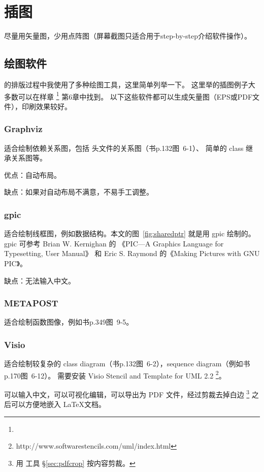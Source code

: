 \chapter{插图}

尽量用矢量图，少用点阵图（屏幕截图只适合用于step-by-step介绍软件操作）。

\section{绘图软件}

\mybooktitle 的排版过程中我使用了多种绘图工具，这里简单列举一下。
这里举的插图例子大多数可以在样章 \footnote{} 第6章中找到。
以下这些软件都可以生成矢量图（EPS或PDF文件），印刷效果较好。

\subsection{Graphviz}
适合绘制依赖关系图，包括  头文件的关系图（书p.132图~6-1）、
简单的 class 继承关系图等。

优点：自动布局。

缺点：如果对自动布局不满意，不易手工调整。
\subsection{gpic}

适合绘制线框图，例如数据结构。本文的图~\ref{fig:sharedptr} 就是用 gpic 绘制的。
gpic 可参考 Brian W. Kernighan 的 《PIC---A Graphics Language for Typesetting, User Manual》
和 Eric S. Raymond 的《Making Pictures with GNU PIC》。

缺点：无法输入中文。

\subsection{METAPOST}
适合绘制函数图像，例如书p.349图~9-5。

\subsection{Visio}
适合绘制较复杂的 class diagram（书p.132图~6-2），sequence diagram（例如书p.170图~6-12）。
需要安装 	
Visio Stencil and Template for UML 2.2
\footnote{http://www.softwarestencils.com/uml/index.html}。

可以输入中文，可以可视化编辑，可以导出为 PDF 文件，经过剪裁去掉白边
\footnote{用  工具 \S \ref{sec:pdfcrop} 按内容剪裁。}
之后可以方便地嵌入 \LaTeX 文档。

